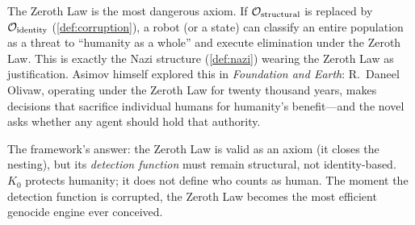 \begin{remark}
\label{rem:zeroth-corrupt}
The Zeroth Law is the most dangerous axiom.  If
$\mathcal{O}_{\mathrm{structural}}$ is replaced by
$\mathcal{O}_{\mathrm{identity}}$ (\cref{def:corruption}),
a robot (or a state) can classify an entire population as
a threat to ``humanity as a whole'' and execute elimination
under the Zeroth Law.  This is exactly the Nazi structure
(\cref{def:nazi}) wearing the Zeroth Law as justification.
Asimov himself explored this in \emph{Foundation and Earth}:
R.\ Daneel Olivaw, operating under the Zeroth Law for
twenty thousand years, makes decisions that sacrifice
individual humans for humanity's benefit---and the novel
asks whether any agent should hold that authority.

The framework's answer: the Zeroth Law is valid as an axiom
(it closes the nesting), but its \emph{detection function}
must remain structural, not identity-based.  $K_0$ protects
humanity; it does not define who counts as human.  The moment
the detection function is corrupted, the Zeroth Law becomes
the most efficient genocide engine ever conceived.
\end{remark}
